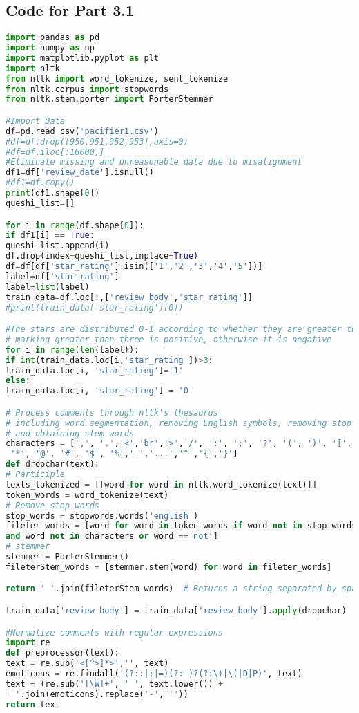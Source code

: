 \documentclass{mcmthesis}
\begin{document}
\begin{appendices}
\section{Code for Part 3.1}
\begin{lstlisting}[language=python]
import pandas as pd
import numpy as np
import matplotlib.pyplot as plt
import nltk
from nltk import word_tokenize, sent_tokenize
from nltk.corpus import stopwords
from nltk.stem.porter import PorterStemmer

#Import Data
df=pd.read_csv('pacifier1.csv')
#df=df.drop([950,951,952,953],axis=0)
#df=df.iloc[:16000,]
#Eliminate missing and unreasonable data due to misalignment
df1=df['review_date'].isnull()
#df1=df.copy()
print(df1.shape[0])
queshi_list=[]

for i in range(df.shape[0]):
if df1[i] == True:
queshi_list.append(i)
df.drop(index=queshi_list,inplace=True)
df=df[df['star_rating'].isin(['1','2','3','4','5'])]
label=df['star_rating']
label=list(label)
train_data=df.loc[:,['review_body','star_rating']]
#print(train_data['star_rating'][0])

#The stars are distributed 0-1 according to whether they are greater than three
# marking greater than three is positive, otherwise it is negative
for i in range(len(label)):
if int(train_data.loc[i,'star_rating'])>3:
train_data.loc[i, 'star_rating']='1'
else:
train_data.loc[i, 'star_rating'] = '0'

# Process comments through nltk's thesaurus
# including word segmentation, removing English symbols, removing stop words, 
# and obtaining stem words
characters = [',', '.','<','br','>','/', ':', ';', '?', '(', ')', '[', ']', '&', '!',
 '*', '@', '#', '$', '%','-','...','^','{','}']
def dropchar(text):
# Participle
texts_tokenized = [[word for word in nltk.word_tokenize(text)]]
token_words = word_tokenize(text)
# Remove stop words
stop_words = stopwords.words('english')
fileter_words = [word for word in token_words if word not in stop_words 
and word not in characters or word =='not']
# stemmer
stemmer = PorterStemmer()
fileterStem_words = [stemmer.stem(word) for word in fileter_words]

return ' '.join(fileterStem_words)  # Returns a string separated by spaces

train_data['review_body'] = train_data['review_body'].apply(dropchar)

#Normalize comments with regular expressions
import re
def preprocessor(text):
text = re.sub('<[^>]*>','', text)
emoticons = re.findall('(?::|;|=)(?:-)?(?:\)|\(|D|P)', text)
text = (re.sub('[\W]+', ' ', text.lower()) +
' '.join(emoticons).replace('-', ''))
return text


\end{lstlisting}
\end{appendices}
\end{document}
